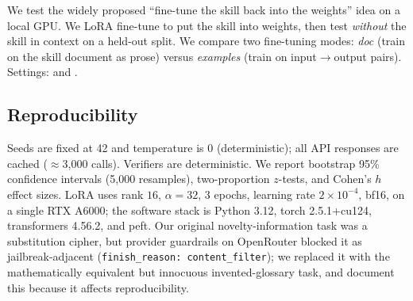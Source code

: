  We test the widely proposed ``fine-tune the skill back
into the weights'' idea on a local GPU. We LoRA fine-tune \qwen to put the skill into weights,
then test \emph{without} the skill in context on a held-out split. We compare two fine-tuning
modes: \emph{doc} (train on the skill document as prose) versus \emph{examples} (train on
input$\to$output pairs). Settings: \vocabzeth and \arithbnine.

\subsection{Reproducibility}
\label{sec:repro}

Seeds are fixed at 42 and temperature is 0 (deterministic); all API responses are cached
($\approx$3{,}000 calls). Verifiers are deterministic. We report bootstrap 95\% confidence
intervals (5{,}000 resamples), two-proportion $z$-tests, and Cohen's $h$ effect sizes. LoRA
uses rank $16$, $\alpha=32$, $3$ epochs, learning rate $2\times10^{-4}$, bf16, on a single RTX
A6000; the software stack is Python 3.12, torch 2.5.1+cu124, transformers 4.56.2, and peft.
Our original novelty-information task was a substitution cipher, but provider guardrails on
OpenRouter blocked it as jailbreak-adjacent (\texttt{finish\_reason: content\_filter}); we
replaced it with the mathematically equivalent but innocuous invented-glossary task, and
document this because it affects reproducibility.
